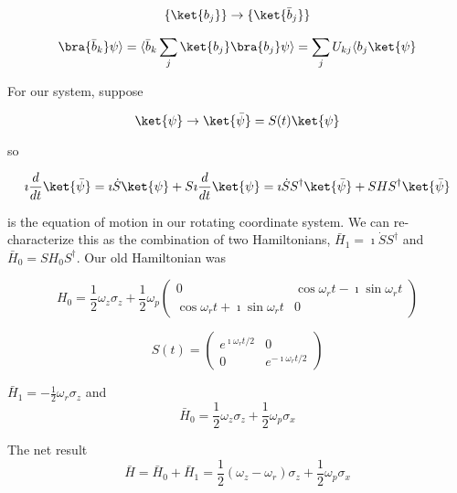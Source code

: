 \documentclass[a4paper,twoside,master.tex]{subfiles}
\begin{document}
\begin{equation}
\{\ket{b_j}\}\to\{\ket{\bar{b}_j}\}
\end{equation}

\begin{equation}
\bra{\bar{b}_k}\psi\rangle = \langle\bar{b}_k\sum_j\ket{b_j}\bra{ b_j}\psi\rangle = \sum_j U_{kj}\langle b_j\ket{\psi}
\end{equation}

For our system, suppose

\begin{equation}
\ket{\psi}\to\ket{\bar{\psi}} = S(t)\ket{\psi}
\end{equation}

so

\begin{equation}
\imath\frac{d}{dt}\ket{\bar{\psi}} = \imath\dot{S}\ket{\psi} + S\imath\frac{d}{dt}\ket{\psi} = \imath\dot{S}S^\dagger\ket{\bar{\psi}} + SHS^\dagger\ket{\bar{\psi}}
\end{equation}

is the equation of motion in our rotating coordinate system. We can
re-characterize this as the combination of two Hamiltonians,
$\bar{H}_1 = \imath\dot{S}S^\dagger$ and
$\bar{H}_0 = SH_0S^\dagger$. Our old Hamiltonian was

\begin{equation}
H_0 = \frac{1}{2}\omega_z\sigma_z + \frac{1}{2}\omega_p\begin{pmatrix}0&\cos\omega_rt-\imath\sin\omega_rt\\\cos\omega_rt+\imath\sin\omega_rt&0\end{pmatrix}
\end{equation}

\begin{equation}
S(t) = \begin{pmatrix}e^{\imath\omega_rt/2}&0\\0&e^{-\imath\omega_rt/2}\end{pmatrix}
\end{equation}

$\bar{H}_1 = -\frac{1}{2}\omega_r\sigma_z$ and
\begin{equation}
\bar{H}_0 = \frac{1}{2}\omega_z\sigma_z+\frac{1}{2}\omega_p\sigma_x
\end{equation}

The net result
\begin{equation}
\bar{H} = \bar{H}_0 + \bar{H}_1 = \frac{1}{2}(\omega_z-\omega_r)\sigma_z + \frac{1}{2}\omega_p\sigma_x
\end{equation}
\end{document}
